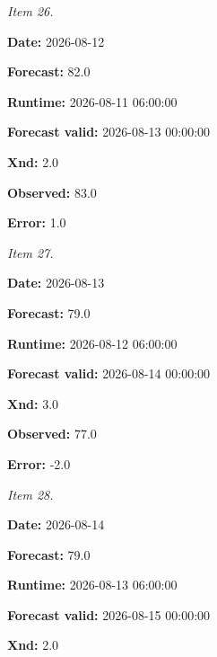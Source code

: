 \documentclass[11pt]{article}
\begin{document}
\par\noindent\textit{Item 26.}\par \par\noindent\textbf{Date:} 2026-08-12

\par\noindent\textbf{Forecast:} 82.0

\par\noindent\textbf{Runtime:} 2026-08-11 06:00:00

\par\noindent\textbf{Forecast valid:} 2026-08-13 00:00:00

\par\noindent\textbf{Xnd:} 2.0

\par\noindent\textbf{Observed:} 83.0

\par\noindent\textbf{Error:} 1.0

\par\noindent\textit{Item 27.}\par \par\noindent\textbf{Date:} 2026-08-13

\par\noindent\textbf{Forecast:} 79.0

\par\noindent\textbf{Runtime:} 2026-08-12 06:00:00

\par\noindent\textbf{Forecast valid:} 2026-08-14 00:00:00

\par\noindent\textbf{Xnd:} 3.0

\par\noindent\textbf{Observed:} 77.0

\par\noindent\textbf{Error:} -2.0

\par\noindent\textit{Item 28.}\par \par\noindent\textbf{Date:} 2026-08-14

\par\noindent\textbf{Forecast:} 79.0

\par\noindent\textbf{Runtime:} 2026-08-13 06:00:00

\par\noindent\textbf{Forecast valid:} 2026-08-15 00:00:00

\par\noindent\textbf{Xnd:} 2.0
\end{document}

